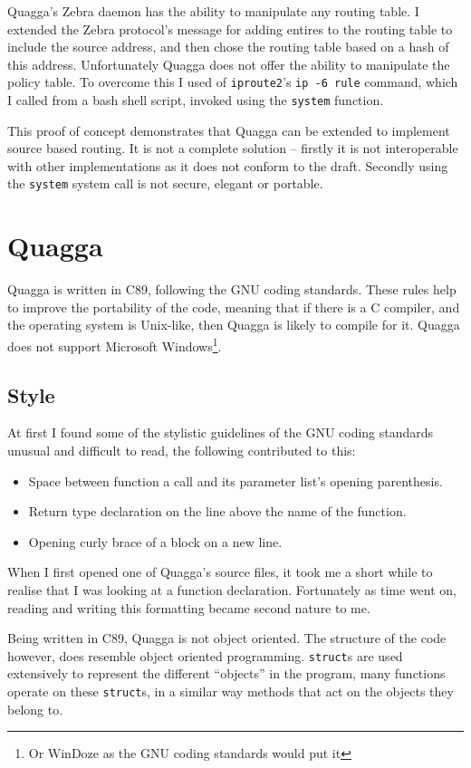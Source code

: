 \documentclass[12pt,a4paper,twoside]{report}
\begin{document}
Quagga's Zebra daemon has the ability to manipulate any routing table. I
extended the Zebra protocol's message for adding entires to the routing table
to include the source address, and then chose the routing table based on a hash
of this address. Unfortunately Quagga does not offer the ability to manipulate
the policy table. To overcome this I used of \texttt{iproute2}'s \texttt{ip
-6 rule} command, which I called from a bash shell script, invoked using the
\texttt{system} function. 

This proof of concept demonstrates that Quagga can be extended to implement
source based routing. It is not a complete solution -- firstly it is not
interoperable with other implementations as it does not conform to the draft.
Secondly using the \texttt{system} system call is not secure, elegant or
portable. 

\section{Quagga}
Quagga is written in C89, following the GNU coding
standards\cite{gnucodestandards}. These rules help to improve the portability
of the code, meaning that if there is a C compiler, and the operating system is
Unix-like, then Quagga is likely to compile for it.  Quagga does not
support Microsoft Windows\footnote{Or WinDoze as the GNU coding standards would
put it}.

\subsection{Style}
At first I found some of the stylistic guidelines of the GNU coding standards
unusual and difficult to read, the following contributed to this:
\begin{itemize} 
  \item Space between function a call and its parameter list's opening parenthesis.
  \item Return type declaration on the line above the name of the function.  
  \item Opening curly brace of a block on a new line.
\end{itemize}

When I first opened one of Quagga's source files, it took me a short while to
realise that I was looking at a function declaration. Fortunately as time went
on, reading and writing this formatting became second nature to me. 

Being written in C89, Quagga is not object oriented. The structure of the code
however, does resemble object oriented programming. \texttt{struct}s are used
extensively to represent the different ``objects'' in the program, many
functions operate on these \texttt{struct}s, in a similar way methods that
act on the objects they belong to.
\end{document}

